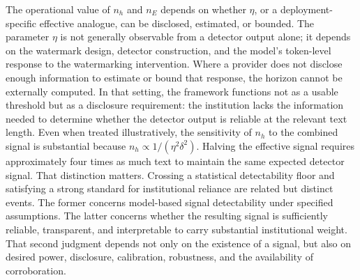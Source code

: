 \documentclass[11pt]{article}
\begin{document}
The operational value of $n_h$ and $n_E$ depends on whether $\eta$, or a
deployment-specific effective analogue, can be disclosed, estimated, or bounded. The parameter $\eta$ is not
generally observable from a detector output alone; it depends on the watermark
design, detector construction, and the model's token-level response to the
watermarking intervention. Where a provider does not disclose enough information to
estimate or bound that response, the horizon cannot be externally computed. In that
setting, the framework functions not as a usable threshold but as a disclosure
requirement: the institution lacks the information needed to determine whether the
detector output is reliable at the relevant text length.
Even when treated illustratively, the sensitivity of $n_h$ to the combined signal
is substantial because $n_h \propto 1/(\eta^2\delta^2)$. Halving the effective
signal requires approximately four times as much text to maintain the same expected
detector signal.
That distinction matters. Crossing a statistical detectability floor and satisfying
a strong standard for institutional reliance are related but distinct events. The
former concerns model-based signal detectability under specified assumptions. The
latter concerns whether the resulting signal is sufficiently reliable, transparent,
and interpretable to carry substantial institutional weight. That second judgment
depends not only on the existence of a signal, but also on desired power,
disclosure, calibration, robustness, and the availability of corroboration.
\end{document}
